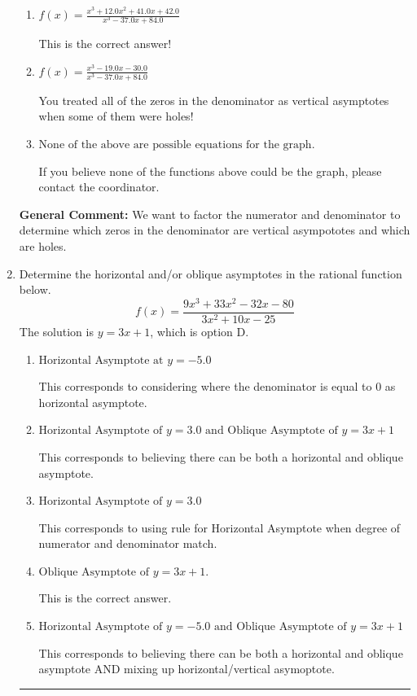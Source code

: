 \documentclass{extbook}[14pt]
\newcommand{\litem}[1]{\item #1

\rule{\textwidth}{0.4pt}}
\begin{document}
\begin{enumerate}
{\begin{enumerate}[label=\Alph*.]
Remember that factors are written as $x-z$. For example, the zero $x=3$ corresponds to the factor $x-(3)$.
\item \( f(x)=\frac{x^{3} +12.0 x^{2} +41.0 x + 42.0}{x^{3} -37.0 x + 84.0} \)

This is the correct answer!
\item \( f(x)=\frac{x^{3} -19.0 x -30.0}{x^{3} -37.0 x + 84.0} \)

You treated all of the zeros in the denominator as vertical asymptotes when some of them were holes!
\item \( \text{None of the above are possible equations for the graph.} \)

If you believe none of the functions above could be the graph, please contact the coordinator.
\end{enumerate}

\textbf{General Comment:} We want to factor the numerator and denominator to determine which zeros in the denominator are vertical asympototes and which are holes.
}
\litem{
Determine the horizontal and/or oblique asymptotes in the rational function below.
\[ f(x) = \frac{9x^{3} +33 x^{2} -32 x -80}{3x^{2} +10 x -25} \]The solution is \( y = 3x + 1 \), which is option D.\begin{enumerate}[label=\Alph*.]
\item \( \text{Horizontal Asymptote at } y = -5.0 \)

This corresponds to considering where the denominator is equal to 0 as horizontal asymptote.
\item \( \text{Horizontal Asymptote of } y = 3.0 \text{ and Oblique Asymptote of } y = 3x + 1 \)

This corresponds to believing there can be both a horizontal and oblique asymptote.
\item \( \text{Horizontal Asymptote of } y = 3.0  \)

This corresponds to using rule for Horizontal Asymptote when degree of numerator and denominator match.
\item \( \text{Oblique Asymptote of } y = 3x + 1. \)

This is the correct answer.
\item \( \text{Horizontal Asymptote of } y = -5.0 \text{ and Oblique Asymptote of } y = 3x + 1 \)

This corresponds to believing there can be both a horizontal and oblique asymptote AND mixing up horizontal/vertical asymoptote.
\end{enumerate}

}
\end{enumerate}
\end{document}
